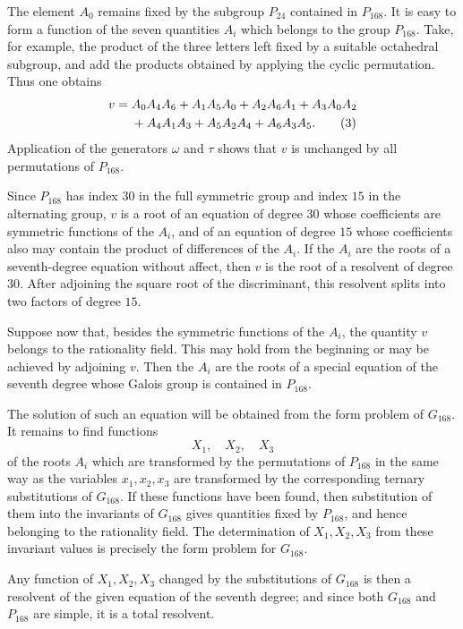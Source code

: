 \documentclass[12pt,a4paper]{article}
\begin{document}
The element \(A_0\) remains fixed by the subgroup \(P_{24}\) contained in \(P_{168}\).  It is easy to form a function of the seven quantities \(A_i\) which belongs to the group \(P_{168}\).  Take, for example, the product of the three letters left fixed by a suitable octahedral subgroup, and add the products obtained by applying the cyclic permutation.  Thus one obtains
\begin{align}
 v={}&A_0A_4A_6+A_1A_5A_0+A_2A_6A_1+A_3A_0A_2\notag\\
 &+A_4A_1A_3+A_5A_2A_4+A_6A_3A_5. \tag{3}
\end{align}
Application of the generators \(\omega\) and \(\tau\) shows that \(v\) is unchanged by all permutations of \(P_{168}\).

Since \(P_{168}\) has index \(30\) in the full symmetric group and index \(15\) in the alternating group, \(v\) is a root of an equation of degree \(30\) whose coefficients are symmetric functions of the \(A_i\), and of an equation of degree \(15\) whose coefficients also may contain the product of differences of the \(A_i\).  If the \(A_i\) are the roots of a seventh-degree equation without affect, then \(v\) is the root of a resolvent of degree \(30\).  After adjoining the square root of the discriminant, this resolvent splits into two factors of degree \(15\).

Suppose now that, besides the symmetric functions of the \(A_i\), the quantity \(v\) belongs to the rationality field.  This may hold from the beginning or may be achieved by adjoining \(v\).  Then the \(A_i\) are the roots of a special equation of the seventh degree whose Galois group is contained in \(P_{168}\).

The solution of such an equation will be obtained from the form problem of \(G_{168}\).  It remains to find functions
\[
 X_1,
\quad X_2,
\quad X_3
\]
of the roots \(A_i\) which are transformed by the permutations of \(P_{168}\) in the same way as the variables \(x_1,x_2,x_3\) are transformed by the corresponding ternary substitutions of \(G_{168}\).  If these functions have been found, then substitution of them into the invariants of \(G_{168}\) gives quantities fixed by \(P_{168}\), and hence belonging to the rationality field.  The determination of \(X_1,X_2,X_3\) from these invariant values is precisely the form problem for \(G_{168}\).

Any function of \(X_1,X_2,X_3\) changed by the substitutions of \(G_{168}\) is then a resolvent of the given equation of the seventh degree; and since both \(G_{168}\) and \(P_{168}\) are simple, it is a total resolvent.
\end{document}

